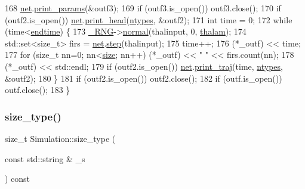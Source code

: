 \begin{DoxyCode}
168     \hyperlink{classSimulation_a980a224fe68945549f217067ffc74f7c}{net}.\hyperlink{classNetwork_afc43116eb2429aeec0f3c6a54d252142}{print\_params}(&outf3);
169     \textcolor{keywordflow}{if} (outf3.is\_open()) outf3.close();
170     \textcolor{keywordflow}{if} (outf2.is\_open()) \hyperlink{classSimulation_a980a224fe68945549f217067ffc74f7c}{net}.\hyperlink{classNetwork_ab572dd33cb91d9f0aae89c4477809d26}{print\_head}(\hyperlink{classSimulation_a445d67187d6cc08c4c098ca498ee87d7}{ntypes}, &outf2);
171     \textcolor{keywordtype}{int} time = 0;
172     \textcolor{keywordflow}{while} (time<\hyperlink{classSimulation_ae57735a4ad942d9d217fb2235a644d1b}{endtime}) \{
173         \hyperlink{main_8cpp_ad20d7a8b3940b60cfd9cd7188fb503ea}{\_RNG}->\hyperlink{classRandomNumbers_a4ef5917200da65aa267735d389bdf995}{normal}(thalinput, 0, \hyperlink{classSimulation_a7fca2f5f79a662f91736b0e5f30598c1}{thalam});
174         std::set<size\_t> firs = \hyperlink{classSimulation_a980a224fe68945549f217067ffc74f7c}{net}.\hyperlink{classNetwork_a4614f267a2238b8a10dfea23b54defac}{step}(thalinput);
175         time++;
176         (*\_outf) << time;
177         \textcolor{keywordflow}{for} (\textcolor{keywordtype}{size\_t} nn=0; nn<\hyperlink{classSimulation_ae198f9ac020ed6bc6ebbd608ab3f959d}{size}; nn++) (*\_outf) << \textcolor{stringliteral}{" "} << firs.count(nn);
178         (*\_outf) << std::endl;
179         \textcolor{keywordflow}{if} (outf2.is\_open()) \hyperlink{classSimulation_a980a224fe68945549f217067ffc74f7c}{net}.\hyperlink{classNetwork_ae460d31557bba058fdf66e4fe5feb801}{print\_traj}(time, \hyperlink{classSimulation_a445d67187d6cc08c4c098ca498ee87d7}{ntypes}, &outf2);
180     \}
181     \textcolor{keywordflow}{if} (outf2.is\_open()) outf2.close();
182     \textcolor{keywordflow}{if} (outf.is\_open()) outf.close();        
183 \}
\end{DoxyCode}
\mbox{\label{classSimulation_a7d0ca858dfec187001ecbab2081f9d04}} 
\subsubsection{\texorpdfstring{size\+\_\+type()}{size\_type()}}
{\footnotesize\ttfamily size\+\_\+t Simulation\+::size\+\_\+type (\begin{DoxyParamCaption}\item[{const std\+::string \&}]{\+\_\+s }\end{DoxyParamCaption}) const}

